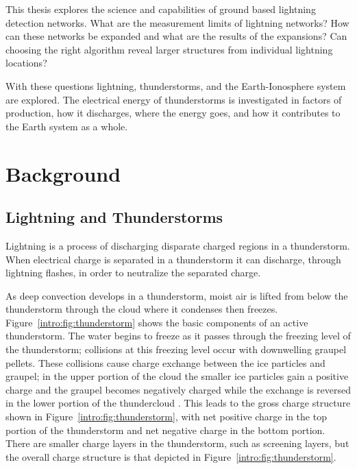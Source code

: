 This thesis explores the science and capabilities of ground based lightning detection networks.
What are the measurement limits of lightning networks?
How can these networks be expanded and what are the results of the expansions?
Can choosing the right algorithm reveal larger structures from individual lightning locations?

With these questions lightning, thunderstorms, and the Earth-Ionosphere system are explored.
The electrical energy of thunderstorms is investigated in factors of production, how it discharges, where the energy goes, and how it contributes to the Earth system as a whole.

\section{Background}

\subsection{Lightning and Thunderstorms}

Lightning is a process of discharging disparate charged regions in a thunderstorm.
When electrical charge is separated in a thunderstorm it can discharge, through lightning flashes, in order to neutralize the separated charge.

As deep convection develops in a thunderstorm, moist air is lifted from below the thunderstorm through the cloud where it condenses then freezes.
Figure~\ref{intro:fig:thunderstorm} shows the basic components of an active thunderstorm.
The water begins to freeze as it passes through the freezing level of the thunderstorm; collisions at this freezing level occur with downwelling graupel pellets.
These collisions cause charge exchange between the ice particles and graupel; in the upper portion of the cloud the smaller ice particles gain a positive charge and the graupel becomes negatively charged while the exchange is reversed in the lower portion of the thundercloud \citep{Saunders1995}.
This leads to the gross charge structure shown in Figure~\ref{intro:fig:thunderstorm}, with net positive charge in the top portion of the thunderstorm and net negative charge in the bottom portion.
There are smaller charge layers in the thunderstorm, such as screening layers, but the overall charge structure is that depicted in Figure~\ref{intro:fig:thunderstorm}.

